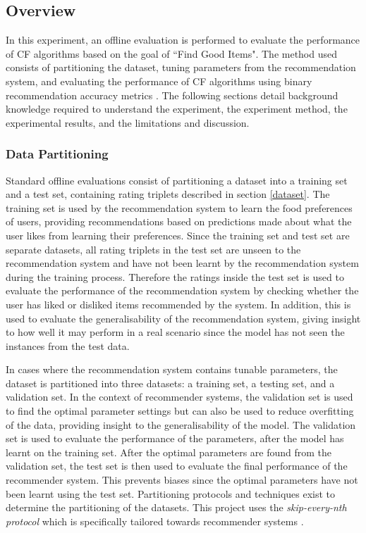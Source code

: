 \subsection{Overview}

In this experiment, an offline evaluation is performed to evaluate the performance of CF algorithms based on the goal of ``Find Good Items". The method used consists of partitioning the dataset, tuning parameters from the recommendation system, and evaluating the performance of CF algorithms using binary recommendation accuracy metrics \cite{zhang}. The following sections detail background knowledge required to understand the experiment, the experiment method, the experimental results, and the limitations and discussion. 

\subsubsection{Data Partitioning} \label{partitioning}

Standard offline evaluations consist of partitioning a dataset into a training set and a test set, containing rating triplets described in section \ref{dataset}. The training set is used by the recommendation system to learn the food preferences of users, providing recommendations based on predictions made about what the user likes from learning their preferences. Since the training set and test set are separate datasets, all rating triplets in the test set are unseen to the recommendation system and have not been learnt by the recommendation system during the training process. Therefore the ratings inside the test set is used to evaluate the performance of the recommendation system by checking whether the user has liked or disliked items recommended by the system. In addition, this is used to evaluate the generalisability of the recommendation system, giving insight to how well it may perform in a real scenario since the model has not seen the instances from the test data. 

In cases where the recommendation system contains tunable parameters, the dataset is partitioned into three datasets: a training set, a testing set, and a validation set. In the context of recommender systems, the validation set is used to find the optimal parameter settings but can also be used to reduce overfitting of the data, providing insight to the generalisability of the model. The validation set is used to evaluate the performance of the parameters, after the model has learnt on the training set. After the optimal parameters are found from the validation set, the test set is then used to evaluate the final performance of the recommender system. This prevents biases since the optimal parameters have not been learnt using the test set. Partitioning protocols and techniques exist to determine the partitioning of the datasets. This project uses the \textit{skip-every-nth protocol} which is specifically tailored towards recommender systems \cite{zhang}.

